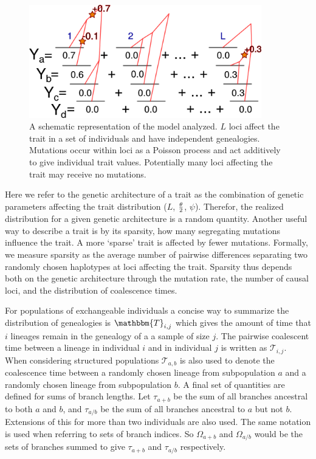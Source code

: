 \begin{figure}
  \centering
  \includegraphics[width=0.9\textwidth]{figures/schema.png}
  \caption{A schematic representation of the model analyzed.
  $L$ loci affect the trait in a set of individuals and have independent
  genealogies. Mutations occur within loci as a Poisson process and act
  additively to give individual trait values. Potentially many loci affecting
  the trait may receive no mutations.}
  \label{fig:schema}
\end{figure}

Here we refer to the genetic architecture of a trait as the combination of
genetic parameters affecting the trait distribution ($L$, $\frac{\theta}{2}$, $\psi$).
Therefor, the realized distribution for a given genetic architecture is a random
quantity. Another useful way to describe a trait is by its sparsity, how many
segregating mutations influence the trait. A more `sparse' trait is affected by
fewer mutations. Formally, we measure sparsity as the average number of pairwise
differences separating two randomly chosen haplotypes at loci affecting the
trait. Sparsity thus depends both on the genetic architecture through the
mutation rate, the number of causal loci, and the distribution of coalescence
times.

For populations of exchangeable individuals a concise way to summarize the
distribution of genealogies is $\mathbbm{T}_{i,j}$ which gives the amount of
time that $i$ lineages remain in the genealogy of a a sample of size $j$. The
pairwise coalescent time between a lineage in individual $i$ and in individual
$j$ is written as $\mathcal{T}_{i,j}$. When considering structured populations
$\mathcal{T}_{a,b}$ is also used to denote the coalescence time between a
randomly chosen lineage from subpopulation $a$ and a randomly chosen lineage
from subpopulation $b$. A final set of quantities are defined for sums of branch
lengths. Let $\tau_{a+b}$ be the sum of all branches ancestral to both $a$ and
$b$, and $\tau_{a/b}$ be the sum of all branches ancestral to $a$ but not $b$.
Extensions of this for more than two individuals are also used. The same
notation is used when referring to sets of branch indices. So $\Omega_{a+b}$ and
$\Omega_{a/b}$ would be the sets of branches summed to give $\tau_{a+b}$ and
$\tau_{a/b}$ respectively.

